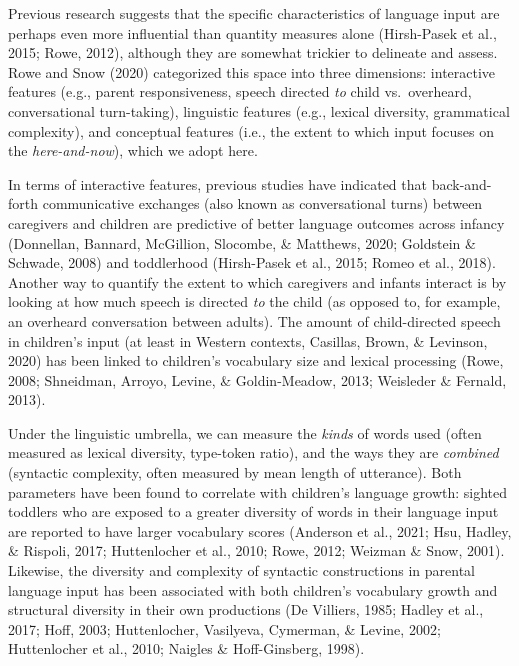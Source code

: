 \documentclass[
  man,floatsintext]{apa6}
\begin{document}
Previous research suggests that the specific characteristics of language input are perhaps even more influential than quantity measures alone (Hirsh-Pasek et al., 2015; Rowe, 2012), although they are somewhat trickier to delineate and assess. Rowe and Snow (2020) categorized this space into three dimensions: interactive features (e.g., parent responsiveness, speech directed \emph{to} child vs.~overheard, conversational turn-taking), linguistic features (e.g., lexical diversity, grammatical complexity), and conceptual features (i.e., the extent to which input focuses on the \emph{here-and-now}), which we adopt here.

In terms of interactive features, previous studies have indicated that back-and-forth communicative exchanges (also known as conversational turns) between caregivers and children are predictive of better language outcomes across infancy (Donnellan, Bannard, McGillion, Slocombe, \& Matthews, 2020; Goldstein \& Schwade, 2008) and toddlerhood (Hirsh-Pasek et al., 2015; Romeo et al., 2018). Another way to quantify the extent to which caregivers and infants interact is by looking at how much speech is directed \emph{to} the child (as opposed to, for example, an overheard conversation between adults). The amount of child-directed speech in children's input (at least in Western contexts, Casillas, Brown, \& Levinson, 2020) has been linked to children's vocabulary size and lexical processing (Rowe, 2008; Shneidman, Arroyo, Levine, \& Goldin-Meadow, 2013; Weisleder \& Fernald, 2013).

Under the linguistic umbrella, we can measure the \emph{kinds} of words used (often measured as lexical diversity, type-token ratio), and the ways they are \emph{combined} (syntactic complexity, often measured by mean length of utterance). Both parameters have been found to correlate with children's language growth: sighted toddlers who are exposed to a greater diversity of words in their language input are reported to have larger vocabulary scores (Anderson et al., 2021; Hsu, Hadley, \& Rispoli, 2017; Huttenlocher et al., 2010; Rowe, 2012; Weizman \& Snow, 2001). Likewise, the diversity and complexity of syntactic constructions in parental language input has been associated with both children's vocabulary growth and structural diversity in their own productions (De Villiers, 1985; Hadley et al., 2017; Hoff, 2003; Huttenlocher, Vasilyeva, Cymerman, \& Levine, 2002; Huttenlocher et al., 2010; Naigles \& Hoff-Ginsberg, 1998).
\end{document}
